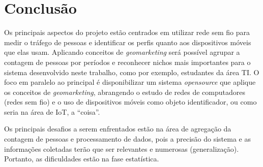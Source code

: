 \chapter{Conclusão}
\label{conclusao}
Os principais aspectos do projeto estão centrados em utilizar rede sem fio para medir o tráfego de pessoas e identificar os perfis
quanto aos dispositivos móveis que elas usam. Aplicando conceitos de \emph{geomarketing} será possível agrupar a contagem de pessoas por períodos
e reconhecer nichos mais importantes para o sistema desenvolvido neste trabalho, como por exemplo, estudantes da área TI.
O foco em paralelo ao principal é disponibilizar um sistema \emph{opensource} que aplique os conceitos de \emph{geomarketing}, abrangendo o estudo
de redes de computadores (redes sem fio) e o uso de dispositivos móveis como objeto identificador, ou como seria na área de IoT, a ``coisa''.

Os principais desafios a serem enfrentados estão na área de agregação da contagem de pessoas e processamento de dados, pois a precisão do sistema
e as informações coletadas terão que ser relevantes e numerosas (generalização). Portanto, as dificuldades estão na fase estatística.
